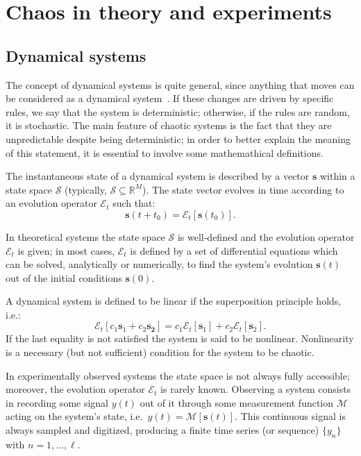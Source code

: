 \chapter{Chaos in theory and experiments}\label{chap: chaos}

\section{Dynamical systems}\label{sec: dynamical systems}

The concept of dynamical systems is quite general, since anything that moves can be considered as a
dynamical system~\cite{ref:fractal_dim}. If these changes are driven
by specific rules, we say that the system is deterministic; otherwise, if the rules
are random, it is stochastic. The main feature of chaotic systems is the fact that they are unpredictable
despite being deterministic; in order to better explain the meaning of this statement, it is essential
to involve some mathemathical definitions.

The instantaneous state of a dynamical system is described by a vector $\mathbf{s}$ within a
state space $\mathcal{S}$ (typically, $\mathcal{S}\subseteq \mathbb{R}^M$).
The state vector evolves in time according to an evolution operator $\mathcal{E}_t$ such that:
\begin{equation}
\label{eq: state space evolution}
    \mathbf{s}(t+t_0)=\mathcal{E}_t[\mathbf{s}(t_0)].
\end{equation}

In theoretical systems the state space $\mathcal{S}$ is well-defined and the evolution operator
$\mathcal{E}_t$ is given; in most cases, $\mathcal{E}_t$ is defined by a set of differential equations
which can be solved, analytically or numerically, to find the system's evolution $\mathbf{s}(t)$
out of the initial conditions $\mathbf{s}(0)$.

A dynamical system is defined to be linear if the superposition principle holds, i.e.:
\begin{equation}
\label{eq: linear systems}
    \mathcal{E}_t[c_1\mathbf{s}_1+c_2\mathbf{s_2}]=c_1\mathcal{E}_t[\mathbf{s}_1]+
    c_2\mathcal{E}_t[\mathbf{s}_2].
\end{equation}
If the last equality is not satisfied the system is said to be nonlinear.
Nonlinearity is a necessary (but not sufficient) condition for the system to be chaotic.

In experimentally observed systems the state space is not always fully accessible; moreover,
the evolution operator $\mathcal{E}_t$ is rarely known.
Observing a system consists in recording some signal $y(t)$ out of it through some measurement
function $\mathcal{M}$ acting on the system's state, i.e.\ $y(t)=\mathcal{M}[\mathbf{s}(t)]$.
This continuous signal is always sampled and digitized, producing a finite time series (or sequence)
$\{y_n\}$ with $n=1,\ldots,\ell$.


